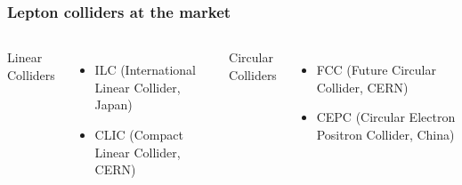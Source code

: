 \documentclass[aspectratio=169]{beamer}
\newcommand{\bluetext}[1]{%
  \textcolor{myBlue}{#1}
}
\begin{document}
\begin{frame}
  \frametitle{Lepton colliders at the market}

  \begin{columns}[c]
    \bluetext{Linear Colliders}
    \begin{itemize}
      \item ILC (International Linear Collider, Japan)
      \item CLIC (Compact Linear Collider, CERN)
    \end{itemize}
    \bluetext{Circular Colliders}
     \begin{itemize}
     \item FCC (Future Circular Collider, CERN)
     \item CEPC (Circular Electron Positron Collider, China)
     \end {itemize}
  

\end{columns}
\end{frame}
\end{document}
